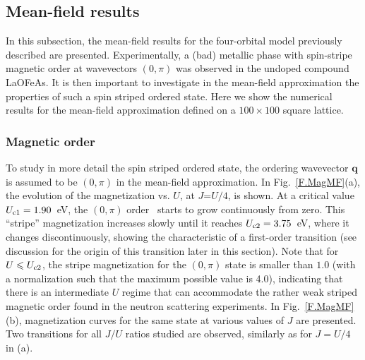 \documentclass[aps,prb,superscriptaddress,preprintnumbers,
showpacs,legalpaper,twoside,twocolumn,amsmath,amssymb]{revtex4}
\begin{document}
\subsection{Mean-field results}
In this subsection, the mean-field results for the
four-orbital model previously described are presented. Experimentally,
a (bad) metallic phase with spin-stripe magnetic order at
wavevectors $(0,\pi)$ was observed in the undoped compound
LaOFeAs.\cite{neutrons1,neutrons2} It is then important to investigate
in the mean-field approximation the properties of such a
spin striped ordered state. Here
we show the numerical results for the mean-field approximation defined
on a $100\times100$ square lattice.

\subsubsection{Magnetic order}\label{sec:megn_order4}


To study in more detail the spin striped ordered state, the
ordering wavevector $\mathbf{q}$ is assumed to be $(0,\pi)$ in the mean-field
approximation. In Fig.~\ref{F.MagMF}(a), the evolution of the
magnetization vs. $U$, at $J$=$U/4$, is shown.
At a critical value $U_{\rm c1}=1.90$~eV, the $(0,\pi)$
order~\cite{noteorder} starts to grow continuously from zero. This ``stripe'' magnetization increases
slowly until it reaches $U_{\rm c2}=3.75$~eV, where it changes
discontinuously, showing the characteristic of a
first-order transition (see discussion for the origin of this transition later in this section). Note that for $U\leqslant U_{\rm c2}$, the
stripe magnetization for the $(0,\pi)$ state is smaller than $1.0$ (with a normalization such
that the maximum possible value is 4.0),
indicating that there is an intermediate $U$ regime that can accommodate
the rather weak striped magnetic order found in the neutron scattering
experiments.\cite{neutrons1,neutrons2}
In Fig.~\ref{F.MagMF}(b), magnetization curves for
the same state at various values of $J$ are presented. Two
transitions for all $J/U$ ratios studied are observed,
similarly as for $J=U/4$ in
(a).
\end{document}
